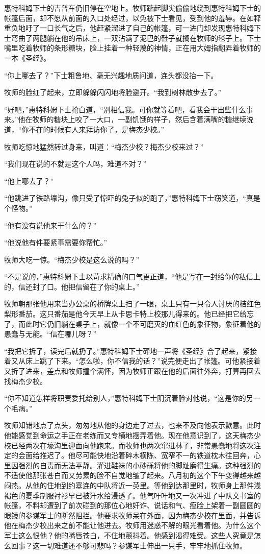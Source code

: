     惠特科姆下士的吉普车仍旧停在空地上。牧师踮起脚尖偷偷地绕到惠特科姆下士的帐篷后面，却不愿从前面的入口处经过，以免被下士看见，受到他的羞辱。在如释重负地吁了一口长气之后，他赶紧溜进了自己的帐篷，可一进门却发现惠特科姆下士弯曲了两腿躺在他的吊床上，一双沾满了泥巴的鞋子就搁在牧师的毯子上。下士嘴里吃着牧师的条形糖块，脸上挂着一种轻蔑的神情，正在用大姆指翻弄着牧师的一本《圣经》。

    “你上哪去了？”下士粗鲁地、毫无兴趣地质问道，连头都没抬一下。

    牧师的脸红了起来，立即躲躲闪闪地将脸避开。“我到树林散步去了。”

    “好吧，”惠特科姆下士抢白道，“别相信我。可你就等着吧，看我会干出些什么事来。”他在牧师的糖块上咬了一大口，一副饥饿的样子，然后含着满嘴的糖继续说道，“你不在的时候有人来拜访你了，是梅杰少校。”

    牧师吃惊地猛然转过身来，叫道：“梅杰少校？梅杰少校来过？”

    “我们现在说的不就是这个人吗，难道不对？”

    “他上哪去了？”

    “他跳进了铁路壕沟，像只受了惊吓的兔子似的跑了，”惠特科姆下士窃笑道，“真是个怪物。”

    “他有没有说他来干什么的？”

    “他说他有件要紧事需要你帮忙。”

    牧师大吃一惊。“梅杰少校是这么说的吗？”

    “不是说的，”惠特科姆下士以苛求精确的口气更正道，“他是写在一封给你的私信上的，信还封了口。他把信留在了你的桌上。”

    牧师朝那张他用来当办公桌的桥牌桌上扫了一眼，桌上只有一只令人讨厌的桔红色梨形番茄。这只番茄是他今天早上从卡思卡特上校那儿得来的。他已经把它给忘了，而此时它仍旧躺在桌子上，就像一个不可磨灭的血红色的象征物，象征着他的愚蠢与无能。“信在哪儿呀？”

    “我把它拆了，读完后就扔了。”惠特科姆下士砰地一声将《圣经》合了起来，紧接着又从床上跳了下来。“怎么啦，你不信我的话？”说完便走出了帐篷。可他紧接着又折了进来，差点和牧师撞个满怀，因为牧师正跟在他的后面往外奔，打算再回去找梅杰少校。

    “你不知道怎样将职责委托给别人，”惠特科姆下士阴沉着脸对他说，“这是你的另一个毛病。”

    牧师知错地点了点头，匆匆地从他的身边走了过去，也来不及向他表示歉意。此时他能感觉到命运之手正在老练而又专横地摆弄着他。现在他意识到了，这天梅杰少校已经两次在壕沟里迎面向他跑来。而牧师也两次窜进林子，非常愚蠢地将这次注定的会面给推迟了。他尽可能快地沿着碎木横陈、宽窄不一的铁道枕木往回奔，心里因强烈的自责而无法平静。灌进鞋袜的小砂砾将他的脚趾磨得生痛。这种强烈的不适使他那张苍白而又劳累的脸不自觉地皱了起来。八月初的这个下午变得越来越闷热。从他的住地到约塞连的中队将近一英里。等他到达那里时，牧师身上那件浅褐色的夏季制服衬衫早已被汗水给浸透了。他气吁吁地又一次冲进了中队文书室的帐篷，不料却遭到了前次碰到的那位心地奸诈、说话和气、瘦脸上架着一副圆圆的眼镜的参谋军士的断然阻拦。他要求牧师呆在外面，因为梅杰少校在里面，并告诉他在梅杰少校出来之前不能让他进去。牧师用迷惑不解的眼光看着他。为什么这个军士这么恨他？他的嘴唇苍白，不住地颤抖着。他感到渴得难受。这些人究竟是怎么回事？这一切难道还不够可悲吗？参谋军士伸出一只手，牢牢地抓住牧师。

